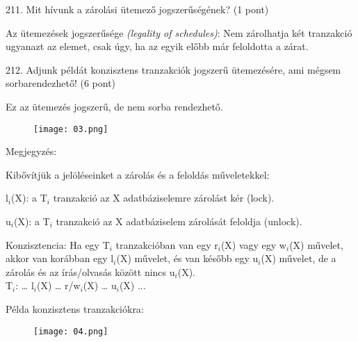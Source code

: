 \documentclass[a4paper,11.5pt, table]{article}
\begin{document}
211. Mit hívunk a zárolási ütemező jogszerűségének? (1 pont)
	\begin{compactitem}
		\item Az ütemezések jogszerűsége\textit{ (legality of schedules)}: 
		Nem zárolhatja két tranzakció ugyanazt az elemet, csak úgy, ha az egyik előbb már feloldotta a zárat.
	\end{compactitem}

212. Adjunk példát konzisztens tranzakciók jogszerű ütemezésére, ami mégsem sorbarendezhető! (6 pont)
	\begin{compactitem}
		\item Ez az ütemezés jogszerű, de nem sorba rendezhető. 
		\begin{figure}[h]
			\centering
			\texttt{[image: 03.png]}
		\end{figure}
		
		\item Megjegyzés:
		\begin{compactitem}
			\item Kibővítjük a jelöléseinket a zárolás és a feloldás műveletekkel:
			\begin{compactitem}
				\item l$ _{i} $(X): a T$ _{i} $ tranzakció az X adatbáziselemre zárolást kér (lock).
				\item u$ _{i} $(X): a T$ _{i} $ tranzakció az X adatbáziselem zárolását feloldja (unlock).
			\end{compactitem}
			\item Konzisztencia: Ha egy T$ _{i} $ tranzakcióban van egy r$ _{i} $(X) vagy egy w$ _{i} $(X) művelet, akkor van korábban egy l$ _{i} $(X) művelet, és van később egy u$ _{i} $(X) művelet, de a zárolás és az írás/olvasás között nincs u$ _{i} $(X).\\
			T$ _{i} $:  … l$ _{i} $(X) … r/w$ _{i} $(X) … u$ _{i} $(X) ...
			 \item Példa konzisztens tranzakciókra:
			 \begin{figure}[h]
			 	\centering
			 	\texttt{[image: 04.png]}
			 \end{figure}			 
		\end{compactitem}
	\end{compactitem}
\end{document}
